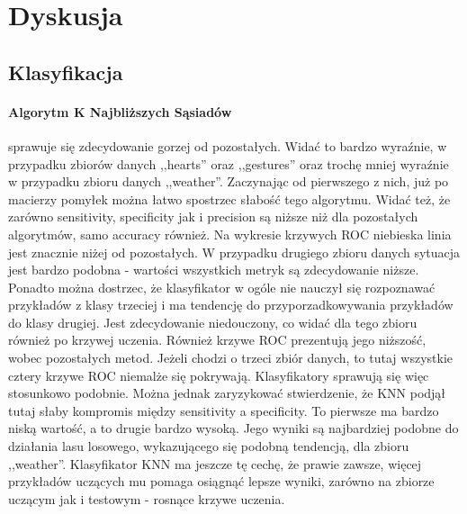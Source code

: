 \documentclass{classrep}
\begin{document}
    \section{Dyskusja}
    \label{summary} {

        \subsection{Klasyfikacja}
        \label{summary:classification} {

            \paragraph{Algorytm K Najbliższych Sąsiadów} sprawuje się zdecydowanie
            gorzej od pozostałych. Widać to bardzo wyraźnie, w przypadku zbiorów danych
            ,,hearts'' oraz ,,gestures'' oraz trochę mniej wyraźnie w przypadku zbioru
            danych ,,weather''. Zaczynając od pierwszego z nich, już po macierzy
            pomyłek można łatwo spostrzec słabość tego algorytmu. Widać też, że zarówno
            sensitivity, specificity jak i precision są niższe niż dla pozostałych
            algorytmów, samo accuracy również. Na wykresie krzywych ROC niebieska linia
            jest znacznie niżej od pozostałych. W przypadku drugiego zbioru danych
            sytuacja jest bardzo podobna - wartości wszystkich metryk są zdecydowanie
            niższe. Ponadto można dostrzec, że klasyfikator w ogóle nie nauczył się
            rozpoznawać przykładów z klasy trzeciej i ma tendencję do
            przyporzadkowywania przykładów do klasy drugiej. Jest zdecydowanie
            niedouczony, co widać dla tego zbioru również po krzywej uczenia. Również
            krzywe ROC prezentują jego niższość, wobec pozostałych metod. Jeżeli chodzi
            o trzeci zbiór danych, to tutaj wszystkie cztery krzywe ROC niemalże się
            pokrywają. Klasyfikatory sprawują się więc stosunkowo podobnie. Można
            jednak zaryzykować stwierdzenie, że KNN podjął tutaj słaby kompromis między
            sensitivity a specificity. To pierwsze ma bardzo niską wartość, a to drugie
            bardzo wysoką. Jego wyniki są najbardziej podobne do działania lasu
            losowego, wykazującego się podobną tendencją, dla zbioru ,,weather''.
            Klasyfikator KNN ma jeszcze tę cechę, że prawie zawsze, więcej przykładów
            uczących mu pomaga osiągnąć lepsze wyniki, zarówno na zbiorze uczącym jak i
            testowym - rosnące krzywe uczenia.

}}
\end{document}
